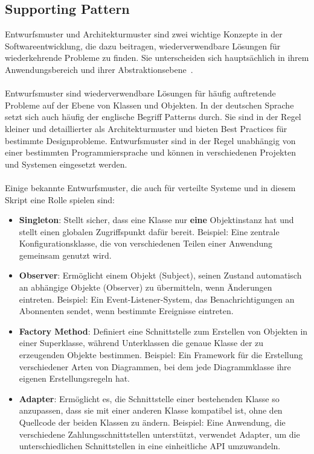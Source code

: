 \subsection{Supporting Pattern}

Entwurfsmuster und Architekturmuster sind zwei wichtige Konzepte in der Softwareentwicklung, die dazu beitragen, wiederverwendbare Lösungen für wiederkehrende Probleme zu finden. Sie unterscheiden sich hauptsächlich in ihrem Anwendungsbereich und ihrer Abstraktionsebene~\cite{gamma1994design}.
\\\\
Entwurfsmuster sind wiederverwendbare Lösungen für häufig auftretende Probleme auf der Ebene von Klassen und Objekten. In der deutschen Sprache setzt sich auch häufig der englische Begriff Patterns durch. Sie sind in der Regel kleiner und detaillierter als Architekturmuster und bieten Best Practices für bestimmte Designprobleme. Entwurfsmuster sind in der Regel unabhängig von einer bestimmten Programmiersprache und können in verschiedenen Projekten und Systemen eingesetzt werden.
\\\\
Einige bekannte Entwurfsmuster, die auch für verteilte Systeme und in diesem Skript eine Rolle spielen sind:
\begin{itemize}
\item \textbf{Singleton}: Stellt sicher, dass eine Klasse nur \textbf{eine} Objektinstanz hat und stellt einen globalen Zugriffspunkt dafür bereit. Beispiel: Eine zentrale Konfigurationsklasse, die von verschiedenen Teilen einer Anwendung gemeinsam genutzt wird.
\item \textbf{Observer}: Ermöglicht einem Objekt (Subject), seinen Zustand automatisch an abhängige Objekte (Observer) zu übermitteln, wenn Änderungen eintreten. Beispiel: Ein Event-Listener-System, das Benachrichtigungen an Abonnenten sendet, wenn bestimmte Ereignisse eintreten.
\item \textbf{Factory Method}: Definiert eine Schnittstelle zum Erstellen von Objekten in einer Superklasse, während Unterklassen die genaue Klasse der zu erzeugenden Objekte bestimmen. Beispiel: Ein Framework für die Erstellung verschiedener Arten von Diagrammen, bei dem jede Diagrammklasse ihre eigenen Erstellungsregeln hat.
\item \textbf{Adapter}: Ermöglicht es, die Schnittstelle einer bestehenden Klasse so anzupassen, dass sie mit einer anderen Klasse kompatibel ist, ohne den Quellcode der beiden Klassen zu ändern. Beispiel: Eine Anwendung, die verschiedene Zahlungsschnittstellen unterstützt, verwendet Adapter, um die unterschiedlichen Schnittstellen in eine einheitliche API umzuwandeln.
\end{itemize}
